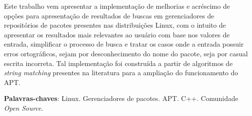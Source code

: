 \begin{resumo}

    

Este trabalho vem apresentar a implementação de melhorias e acréscimo de opções para  apresentação de resultados de buscas em gerenciadores de repositórios de pacotes presentes nas distribuições Linux, com o intuito de apresentar os resultados mais relevantes ao usuário com base nos valores de entrada, simplificar o processo de busca e tratar os casos onde a entrada possuir erros ortográficos, sejam por desconhecimento do nome do pacote, seja por casual escrita incorreta. Tal implementação foi construída a partir de algoritmos de \textit{string matching} presentes na literatura para a ampliação do funcionamento do APT.

 \vspace{\onelineskip}
    
 \noindent
 \textbf{Palavras-chaves}: Linux. Gerenciadores de pacotes. APT. C++. Comunidade \textit{Open Source}.
\end{resumo}
